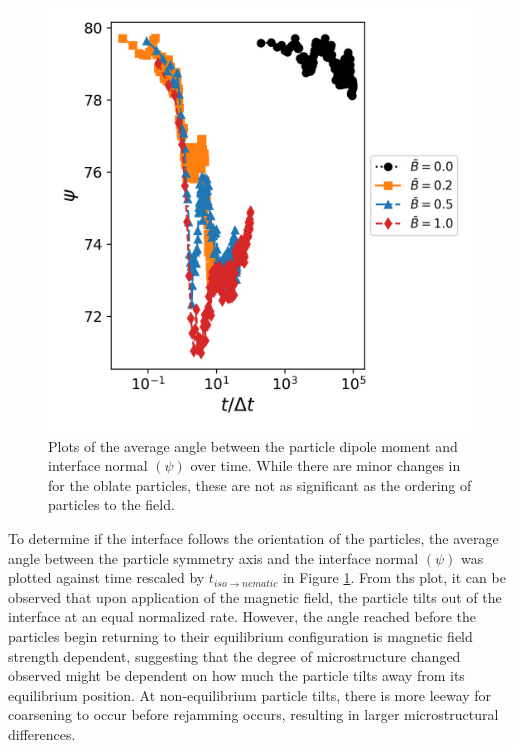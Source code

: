 \begin{figure}
    \centering
    \includegraphics[scale = 0.5]{figures/results/paper2/interface_angle.png}
    \caption{Plots of the average angle between the particle dipole moment and interface normal $(\psi)$ over time. While there are minor changes in for the oblate particles, these are not as significant as the ordering of particles to the field.}
    \label{fig:P2_interface_angle}
\end{figure}

To determine if the interface follows the orientation of the particles, the average angle between the particle symmetry axis and the interface normal $(\psi)$ was plotted against time rescaled by $t_{iso \rightarrow nematic}$ in Figure \ref{fig:P2_interface_angle}. From ths plot, it can be observed that upon application of the magnetic field, the particle tilts out of the interface at an equal normalized rate. However, the angle reached before the particles begin returning to their equilibrium configuration is magnetic field strength dependent, suggesting that the degree of microstructure changed observed might be dependent on how much the particle tilts away from its equilibrium position. At non-equilibrium particle tilts, there is more leeway for coarsening to occur before rejamming occurs, resulting in larger microstructural differences. 

